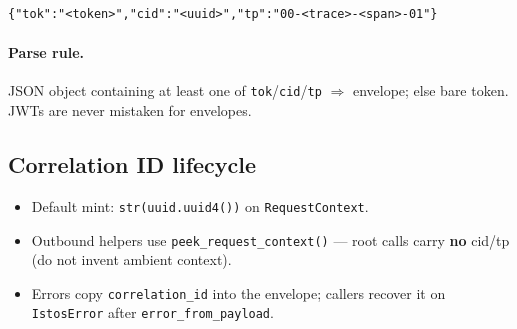 \documentclass[11pt,a4paper]{article}
\begin{document}
\begin{lstlisting}[language={}]
{"tok":"<token>","cid":"<uuid>","tp":"00-<trace>-<span>-01"}
\end{lstlisting}

\paragraph{Parse rule.} JSON object containing at least one of
\texttt{tok}/\texttt{cid}/\texttt{tp} $\Rightarrow$ envelope; else bare token.
JWTs are never mistaken for envelopes.

\subsection{Correlation ID lifecycle}

\begin{center}
\end{center}

\begin{itemize}[leftmargin=*]
  \item Default mint: \texttt{str(uuid.uuid4())} on \texttt{RequestContext}.
  \item Outbound helpers use \texttt{peek\_request\_context()} --- root calls
        carry \textbf{no} cid/tp (do not invent ambient context).
  \item Errors copy \texttt{correlation\_id} into the envelope; callers recover
        it on \texttt{IstosError} after \texttt{error\_from\_payload}.
\end{itemize}
\end{document}
